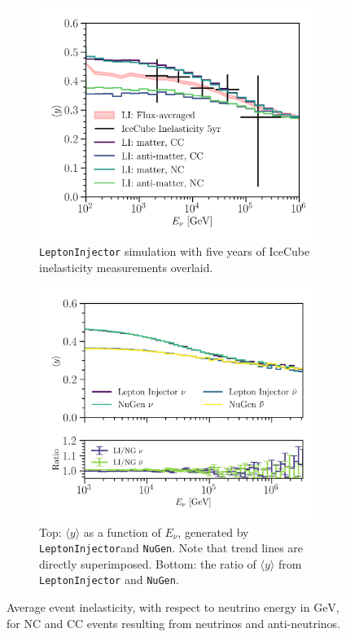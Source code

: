 \documentclass[main.tex]{subfiles}
\newcommand{\LeptonInjector}{\texttt{LeptonInjector}}
\newcommand{\NuGen}{\texttt{NuGen}}
\begin{document}
\begin{figure}
    \centering
    \begin{subfigure}[t]{0.5\linewidth}
    	\centering
        \includegraphics[width=\linewidth]{figures/BjorkenY_vs_energy.png}
        \caption{\LeptonInjector{} simulation with five years of IceCube inelasticity measurements overlaid.}\label{fig:bjorken_v_e}
    \end{subfigure}%
    \begin{subfigure}[t]{0.5\linewidth}
    	\centering
        \includegraphics[width=\linewidth]{figures/NuGenLI_inelasticity.png}
        \caption{Top: $\langle y \rangle$ as a function of $E_{\nu}$, generated by \LeptonInjector and \NuGen. Note that trend lines are directly superimposed. Bottom: the ratio of $\langle y \rangle$ from \LeptonInjector{} and \NuGen.}\label{fig:nugen_li_bjorken}
    \end{subfigure}
    \caption{Average event inelasticity, with respect to neutrino energy in $\si\GeV$, for NC and CC events resulting from neutrinos and anti-neutrinos. }
\end{figure}
\end{document}
